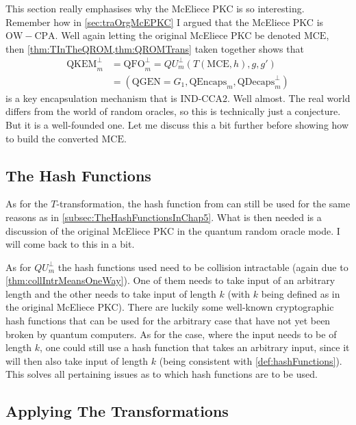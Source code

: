 This section really emphasises why the McEliece PKC is so interesting. Remember how in \cref{sec:traOrgMcEPKC} I argued that the McEliece PKC is $\mathrm{OW-CPA}$. Well again letting the original McEliece PKC be denoted $\mathrm{MCE}$, then \cref{thm:TInTheQROM,thm:QROMTrans} taken together shows that
\begin{align*}
	\mathrm{QKEM}^{\bot}_m &= \mathrm{QFO}^{\bot}_m = QU^{\bot}_m \left( T\left( \mathrm{MCE}, h \right), g, g' \right)\\
		&= \left( \mathrm{QGEN} = G_1, \mathrm{QEncaps}_m, \mathrm{QDecaps}^{\bot}_m \right)
\end{align*}
is a key encapsulation mechanism that is IND-$\mathrm{CCA}2$. Well almost. The real world differs from the world of random oracles, so this is technically just a conjecture. But it is a well-founded one. Let me discuss this a bit further before showing how to build the converted $\mathrm{MCE}$.



\subsection{The Hash Functions}

As for the $T$-transformation, the hash function from \cite{BP} can still be used for the same reasons as in \cref{subsec:TheHashFunctionsInChap5}. What is then needed is a discussion of the original McEliece PKC in the quantum random oracle mode. I will come back to this in a bit.

As for $QU^{\bot}_m$ the hash functions used need to be collision intractable (again due to \cref{thm:collIntrMeansOneWay}). One of them needs to take input of an arbitrary length and the other needs to take input of length $k$ (with $k$ being defined as in the original McEliece PKC). There are luckily some well-known cryptographic hash functions that can be used for the arbitrary case that have not yet been broken by quantum computers. As for the case, where the input needs to be of length $k$, one could still use a hash function that takes an arbitrary input, since it will then also take input of length $k$ (being consistent with \cref{def:hashFunctions}). This solves all pertaining issues as to which hash functions are to be used.



\subsection{Applying The Transformations}
\label{subsec:AppTheTransInTheQROM}

